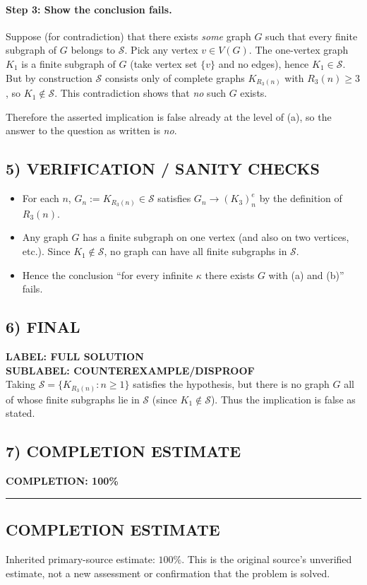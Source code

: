 \paragraph{Step 3: Show the conclusion fails.}
Suppose (for contradiction) that there exists \emph{some} graph $G$ such that every finite subgraph of $G$ belongs to $\mathcal S$.
Pick any vertex $v\in V(G)$. The one-vertex graph $K_1$ is a finite subgraph of $G$ (take vertex set $\{v\}$ and no edges), hence $K_1\in\mathcal S$.
But by construction $\mathcal S$ consists only of complete graphs $K_{R_3(n)}$ with $R_3(n)\ge 3$, so $K_1\notin\mathcal S$.
This contradiction shows that \emph{no} such $G$ exists.

Therefore the asserted implication is false already at the level of (a), so the answer to the question as written is \emph{no}.

\subsection*{5) VERIFICATION / SANITY CHECKS}
\begin{itemize}
\item For each $n$, $G_n:=K_{R_3(n)}\in\mathcal S$ satisfies $G_n\to (K_3)^e_n$ by the definition of $R_3(n)$.
\item Any graph $G$ has a finite subgraph on one vertex (and also on two vertices, etc.). Since $K_1\notin\mathcal S$, no graph can have all finite subgraphs in $\mathcal S$.
\item Hence the conclusion ``for every infinite $\kappa$ there exists $G$ with (a) and (b)'' fails.
\end{itemize}

\subsection*{6) FINAL}
\noindent\textbf{LABEL: FULL SOLUTION}\\
\textbf{SUBLABEL: COUNTEREXAMPLE/DISPROOF}\\
Taking $\mathcal S=\{K_{R_3(n)}:n\ge 1\}$ satisfies the hypothesis, but there is no graph $G$ all of whose finite subgraphs lie in $\mathcal S$ (since $K_1\notin\mathcal S$). Thus the implication is false as stated.

\subsection*{7) COMPLETION ESTIMATE}
\noindent\textbf{COMPLETION: 100\%}

\hrule



\subsection*{COMPLETION ESTIMATE}
Inherited primary-source estimate: $100\%$. This is the original source's unverified estimate, not a new assessment or confirmation that the problem is solved.
